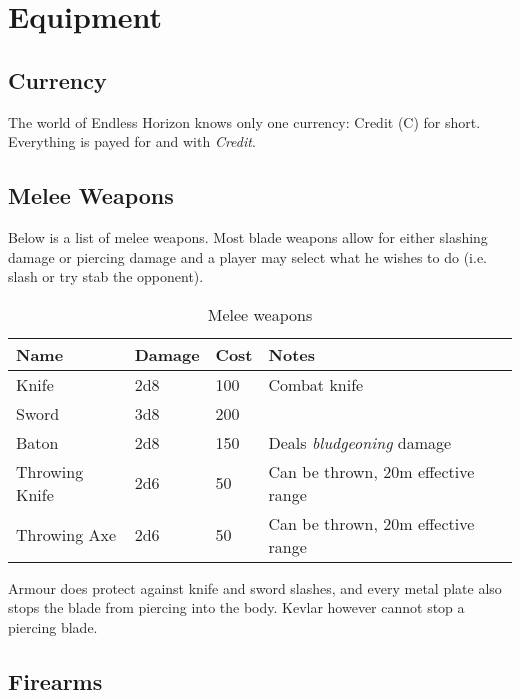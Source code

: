 \chapter{Equipment}

\section{Currency}

The world of Endless Horizon knows only one currency: Credit (C) for short.
Everything is payed for and with \emph{Credit}.

\section{Melee Weapons}

Below is a list of melee weapons. Most blade weapons allow for either slashing
damage or piercing damage and a player may select what he wishes to do (i.e.
slash or try stab the opponent).

\begin{table}
  \caption{Melee weapons}
  \begin{center}
    \begin{tabular}{| l | l | l | l | l |}
      \hline
      \textbf{Name} & \textbf{Damage} & \textbf{Cost} & \textbf{Notes} \\ \hline

      Knife & 2d8 & 100 & Combat knife \\ \hline
      Sword & 3d8 & 200 & \\ \hline
      Baton & 2d8 & 150 & Deals \emph{bludgeoning} damage \\ \hline

      Throwing Knife & 2d6 & 50 & Can be thrown, 20m effective range \\ \hline
      Throwing Axe   & 2d6 & 50 & Can be thrown, 20m effective range \\ \hline

    \end{tabular}
  \end{center}
\end{table}

Armour does protect against knife and sword slashes, and every metal plate
also stops the blade from piercing into the body. Kevlar however cannot stop
a piercing blade.

\section{Firearms}

